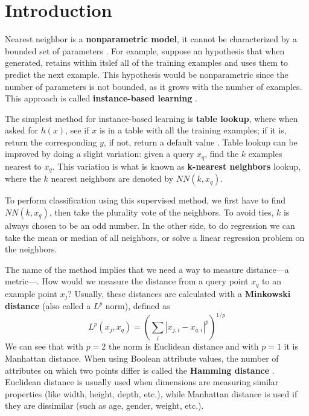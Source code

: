\documentclass[10pt]{article}
\begin{document}
\section{Introduction}
Nearest neighbor is a \textbf{nonparametric model}, it cannot be characterized by a bounded set of parameters \cite{ai}. For example, suppose an hypothesis that when generated, retains within itslef all of the training examples and uses them to predict the next example. This hypothesis would be nonparametric since the number of parameters is not bounded, as it grows with the number of examples. This approach is called \textbf{instance-based learning} \cite{ai}. \par
The simplest method for instance-based learning is \textbf{table lookup}, where when asked for $h(x)$, see if $x$ is in a table with all the training examples; if it is, return the corresponding $y$, if not, return a default value \cite{ai}. Table lookup can be improved by doing a slight variation: given a query $x_{q}$, find the $k$ examples nearest to $x_{q}$. This variation is what is known as \textbf{k-nearest neighbors} lookup, where the $k$ nearest neighbors are denoted by $NN(k, x_{q})$. \par
To perform classification using this supervised method, we first have to find $NN(k, x_{q})$, then take the plurality vote of the neighbors. To avoid ties, $k$ is always chosen to be an odd number. In the other side, to do regression we can take the mean or median of all neighbors, or solve a linear regression problem on the neighbors. \par
The name of the method implies that we need a way to measure distance---a metric---. How would we measure the distance from a query point $x_{q}$ to an example point $x_{j}$? Usually, these distances are calculated with a \textbf{Minkowski distance} (also called a $L^{p}$ norm), defined as
\begin{equation*}
    L^{p}(x_{j}, x_{q}) = \left(\sum_{i}\left|x_{j, i} - x_{q, i}\right|^{p}\right)^{1/p}
\end{equation*}
We can see that with $p = 2$ the norm is Euclidean distance and with $p = 1$ it is Manhattan distance. When using Boolean attribute values, the number of attributes on which two points differ is called the \textbf{Hamming distance} \cite{ai}. Euclidean distance is usually used when dimensions are measuring similar properties (like width, height, depth, etc.), while Manhattan distance is used if they are dissimilar (such as age, gender, weight, etc.). \par
\end{document}
